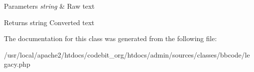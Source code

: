 \begin{DoxyParams}{Parameters}
{\em string} & Raw text \\
\hline
\end{DoxyParams}
\begin{DoxyReturn}{Returns}
string Converted text 
\end{DoxyReturn}


The documentation for this class was generated from the following file\-:\begin{DoxyCompactItemize}
\item 
/usr/local/apache2/htdocs/codebit\-\_\-org/htdocs/admin/sources/classes/bbcode/legacy.\-php\end{DoxyCompactItemize}
